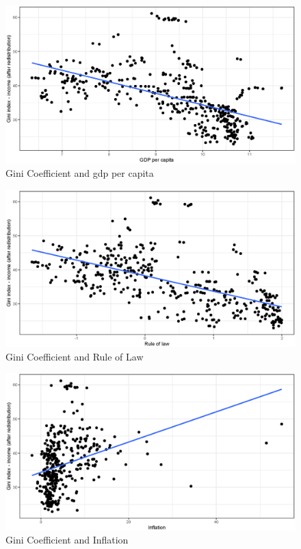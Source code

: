 \documentclass[a4paper,11pt]{article}
\begin{document}
\begin{figure}
    \caption{Gini Coefficient and \ac{gdp} per capita}
    \label{fig:ginigdp}
\includegraphics[width=\textwidth, keepaspectratio]{figures/GDPGiniNet}
\end{figure}

\begin{figure}
    \caption{Gini Coefficient and Rule of Law}
    \label{fig:ginirule}
\includegraphics[width=\textwidth, keepaspectratio]{figures/RuleLawGiniNet}
\end{figure}

\begin{figure}
    \caption{Gini Coefficient and Inflation}
    \label{fig:giniinfl}
\includegraphics[width=\textwidth, keepaspectratio]{figures/InflGiniNet}
\end{figure}
\end{document}
